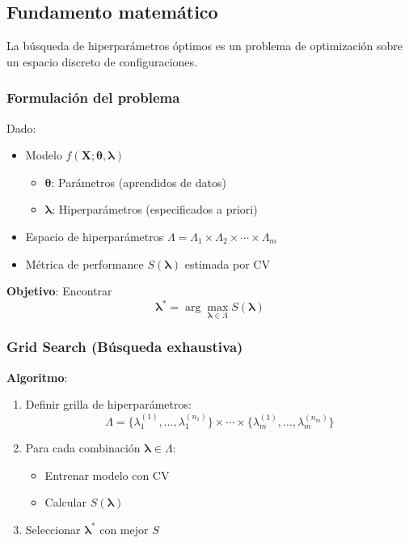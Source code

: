\documentclass[
  doc,
  floatsintext,
  longtable,
  a4paper,
  nolmodern,
  notxfonts,
  notimes,
  12pt,
  colorlinks=true,linkcolor=blue,citecolor=blue,urlcolor=blue]{apa7}
\providecommand{\tightlist}{%
  \setlength{\itemsep}{0pt}\setlength{\parskip}{0pt}}
\begin{document}
\subsection{Fundamento matemático}\label{fundamento-matemuxe1tico-1}

La búsqueda de hiperparámetros óptimos es un problema de optimización
sobre un espacio discreto de configuraciones.

\subsubsection{Formulación del
problema}\label{formulaciuxf3n-del-problema}

Dado:

\begin{itemize}
\tightlist
\item
  Modelo \(f(\mathbf{X}; \boldsymbol{\theta}, \boldsymbol{\lambda})\)

  \begin{itemize}
  \tightlist
  \item
    \(\boldsymbol{\theta}\): Parámetros (aprendidos de datos)
  \item
    \(\boldsymbol{\lambda}\): Hiperparámetros (especificados a priori)
  \end{itemize}
\item
  Espacio de hiperparámetros
  \(\Lambda = \Lambda_1 \times \Lambda_2 \times \cdots \times \Lambda_m\)
\item
  Métrica de performance \(S(\boldsymbol{\lambda})\) estimada por CV
\end{itemize}

\textbf{Objetivo}: Encontrar \[
\boldsymbol{\lambda}^* = \arg\max_{\boldsymbol{\lambda} \in \Lambda} S(\boldsymbol{\lambda})
\]

\subsubsection{Grid Search (Búsqueda
exhaustiva)}\label{grid-search-buxfasqueda-exhaustiva}

\textbf{Algoritmo}:

\begin{enumerate}
\def\labelenumi{\arabic{enumi}.}
\item
  Definir grilla de hiperparámetros: \[
  \Lambda = \{\lambda_1^{(1)}, \ldots, \lambda_1^{(n_1)}\} \times \cdots \times \{\lambda_m^{(1)}, \ldots, \lambda_m^{(n_m)}\}
  \]
\item
  Para cada combinación \(\boldsymbol{\lambda} \in \Lambda\):

  \begin{itemize}
  \tightlist
  \item
    Entrenar modelo con CV
  \item
    Calcular \(S(\boldsymbol{\lambda})\)
  \end{itemize}
\item
  Seleccionar \(\boldsymbol{\lambda}^*\) con mejor \(S\)
\end{enumerate}
\end{document}
